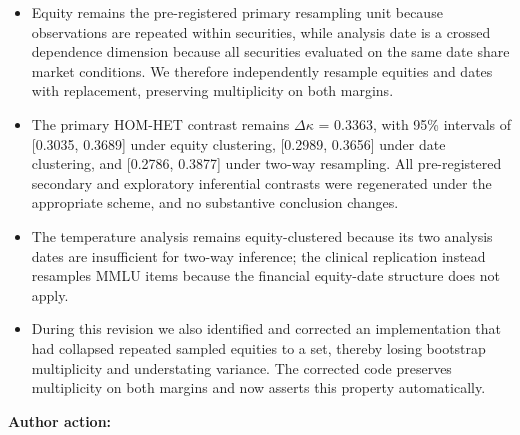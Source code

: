 \documentclass[11pt]{article}
\begin{document}
\begin{itemize}

\item Equity remains the pre-registered primary resampling unit because observations are repeated within securities, while analysis date is a crossed dependence dimension because all securities evaluated on the same date share market conditions. We therefore independently resample equities and dates with replacement, preserving multiplicity on both margins.

\item The primary HOM-HET contrast remains $\Delta$$\kappa$ = 0.3363, with 95\% intervals of [0.3035, 0.3689] under equity clustering, [0.2989, 0.3656] under date clustering, and [0.2786, 0.3877] under two-way resampling. All pre-registered secondary and exploratory inferential contrasts were regenerated under the appropriate scheme, and no substantive conclusion changes.

\item The temperature analysis remains equity-clustered because its two analysis dates are insufficient for two-way inference; the clinical replication instead resamples MMLU items because the financial equity-date structure does not apply.

\item During this revision we also identified and corrected an implementation that had collapsed repeated sampled equities to a set, thereby losing bootstrap multiplicity and understating variance. The corrected code preserves multiplicity on both margins and now asserts this property automatically.

\end{itemize}

\textbf{Author action:}
\end{document}
